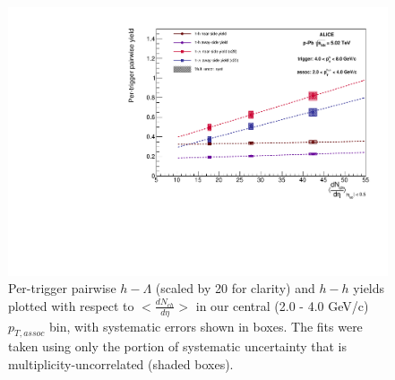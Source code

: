 \documentclass[ALICE,manyauthors]{ALICE_analysis_notes}
\begin{document}
\clearpage 

\begin{figure}[ht]
\centering
\includegraphics[width=6in]{figures/pairwise_plot_new_x_axis_with_fits.pdf}
\caption{Per-trigger pairwise $h-\Lambda$ (scaled by 20 for clarity) and $h-h$ yields plotted with respect to $<\frac{dN_{ch}}{d\eta}>$ in our central (2.0 - 4.0 GeV/c) $p_{T, assoc}$ bin, with systematic errors shown in boxes. The fits were taken using only the portion of systematic uncertainty that is multiplicity-uncorrelated (shaded boxes).}
\label{final_pairwise_yields_dndeta}
\end{figure}

\clearpage 
\end{document}
